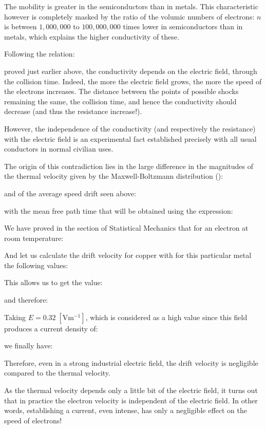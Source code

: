 	The mobility is greater in the semiconductors than in metals. This characteristic however is completely masked by the ratio of the volumic numbers of electrons: $n$ is between $1,000,000$ to $100,000,000$ times lower in semiconductors than in metals, which explains the higher conductivity of these.
	
	Following the relation:
	
	proved just earlier above, the conductivity depends on the electric field, through the collision time. Indeed, the more the electric field grows, the more the speed of the electrons increases. The distance between the points of possible shocks remaining the same, the collision time, and hence the conductivity should decrease (and thus the resistance increase!).
	
	However, the independence of the conductivity (and respectively the resistance) with the electric field is an experimental fact established precisely with all usual conductors in normal civilian uses.	
	
	The origin of this contradiction lies in the large difference in the magnitudes of the thermal velocity given by the Maxwell-Boltzmann distribution ():
	
	and of the average speed drift seen above:
	
	with the mean free path time that will be obtained using the expression:
	
	
	We have proved in the section of Statistical Mechanics that for an electron at room temperature:
	
	And let us calculate the drift velocity for copper with for this particular metal the following values:
	
	This allows us to get the value:
	
	and therefore:
	
	Taking $E=0.32 \;[\text{Vm}{}^{-1}]$, which is considered as a high value since this field produces a current density of:
	
	we finally have:
	
	Therefore, even in a strong industrial electric field, the drift velocity is negligible compared to the thermal velocity.
	
	As the thermal velocity depends only a little bit of the electric field, it turns out that in practice the electron velocity is independent of the electric field. In other words, establishing a current, even intense, has only a negligible effect on the speed of electrons!
	
